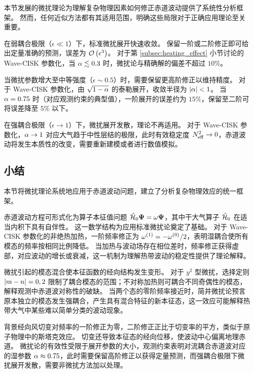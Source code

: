 本节发展的微扰理论为理解复杂物理因素如何修正赤道波动提供了系统性分析框架。
然而，任何近似方法都有其适用范围，明确这些局限对于正确应用理论至关重要。

在弱耦合极限（$\epsilon \ll 1$）下，标准微扰展开快速收敛。
保留一阶或二阶修正即可给出定量准确的预测，误差为 $\mathcal{O}\left(\epsilon^3\right)$。
对于第 \ref{subsec:heating_effect} 小节讨论的 Wave-CISK 参数化，当 $\alpha \lesssim 0.3$ 时，微扰论与精确解的偏差不超过 $10\%$。

当微扰参数增大至中等强度（$\epsilon \sim 0.5$）时，需要保留更高阶修正以维持精度。
对于 Wave-CISK 参数化，由 $\sqrt{1-\alpha}$ 的泰勒展开，收敛半径为 $\lvert \alpha \rvert < 1$。
当 $\alpha = 0.75$ 时（对应观测约束的典型值），一阶展开的误差约为 $15\%$，保留至二阶可将误差降至 $5\%$ 以下。

在强耦合极限（$\epsilon \to 1$）下，微扰展开发散，理论不再适用。
对于 Wave-CISK 参数化，$\alpha \to 1$ 对应大气趋于中性层结的极限，此时有效稳定度 $N_{\mathrm{eff}}^2 \to 0$，赤道波动将发生本质性的改变，需要重新建模或者进行数值模拟。

\subsection{小结}
\label{subsec:chap4_summary}

本节将微扰理论系统地应用于赤道波动问题，建立了分析复杂物理效应的统一框架。

赤道波动方程可形式化为算子本征值问题 $\hat{\mathcal{H}}_0\bm{\Psi} = \omega\bm{\Psi}$，其中干大气算子 $\hat{\mathcal{H}}_0$ 在适当内积下具有自伴性。
这一数学结构为应用标准微扰论奠定了基础。
对于 Wave-CISK 参数化的非绝热加热，一阶频率修正为 $\omega^{(1)} = -\omega^{(0)}/2$，表明湿耦合使所有模态的频率按相同比例降低。
当加热与波动场存在相位差时，频率修正获得虚部，对应波动的增长或衰减，这一机制为理解热带波动的稳定性提供了理论解释。

微扰引起的模态混合使本征函数的经向结构发生变形。
对于 $y^2$ 型微扰，选择定则 $\lvert m-n \rvert = 0, 2$ 限制了耦合模态的范围；不对称加热则可耦合不同奇偶性的模态，解释观测中赤道波对称性的破缺。
当两个态的零阶频率接近时，简并微扰论预言原本独立的模态发生强耦合，产生具有混合特征的新本征态，这一效应可能解释热带大气中某些难以简单分类的波动现象。

背景经向风切变对频率的一阶修正为零，二阶修正正比于切变率的平方，类似于原子物理中的斯塔克效应。
切变还导致本征态的经向位移，使波动中心偏离地理赤道。
微扰论的有效性受限于展开参数的大小，观测约束表明对流耦合赤道波对应的湿参数 $\alpha \approx 0.75$，此时需要保留高阶修正以获得定量预测，而强耦合极限下微扰展开发散，需要非微扰方法加以处理。
